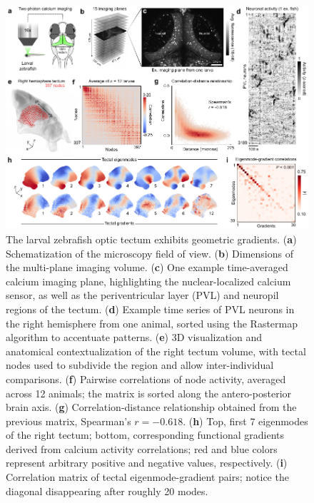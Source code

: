 \documentclass{article}
\begin{document}
\begin{figure}[t]
    \centering
    \includegraphics[width=1.0\linewidth]{figures/figure6.pdf}
    \caption{The larval zebrafish optic tectum exhibits geometric gradients. (\textbf{a}) Schematization of the microscopy field of view. (\textbf{b}) Dimensions of the multi-plane imaging volume. (\textbf{c}) One example time-averaged calcium imaging plane, highlighting the nuclear-localized calcium sensor, as well as the periventricular layer (PVL) and neuropil regions of the tectum. (\textbf{d}) Example time series of PVL neurons in the right hemisphere from one animal, sorted using the Rastermap\cite{stringer2025rastermap} algorithm to accentuate patterns. (\textbf{e}) 3D visualization and anatomical contextualization of the right tectum volume, with tectal nodes used to subdivide the region and allow inter-individual comparisons. (\textbf{f}) Pairwise correlations of node activity, averaged across 12 animals; the matrix is sorted along the antero-posterior brain axis. (\textbf{g}) Correlation-distance relationship obtained from the previous matrix, Spearman's $r=-0.618$. (\textbf{h}) Top, first 7 eigenmodes of the right tectum; bottom, corresponding functional gradients derived from calcium activity correlations; red and blue colors represent arbitrary positive and negative values, respectively. (\textbf{i}) Correlation matrix of tectal eigenmode-gradient pairs; notice the diagonal disappearing after roughly 20 modes.}
    \label{fig6}
    \hrulefill
\end{figure}
\end{document}
